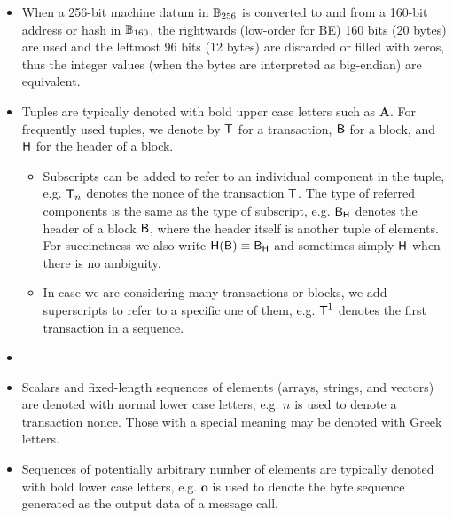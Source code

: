 \begin{itemize}[nosep]
	\item When a 256-bit machine datum in $\mathbb{B}_{256}$ is converted to and from a 160-bit address or hash in $\mathbb{B}_{160}$, the rightwards (low-order for BE) 160 bits (20 bytes) are used and the leftmost 96 bits (12 bytes) are discarded or filled with zeros, thus the integer values (when the bytes are interpreted as big-endian) are equivalent.

	\item Tuples are typically denoted with bold upper case letters such as $\mathbf{A}$. 
	For frequently used tuples, we denote by $\textsf{T}$ for a {\name} transaction, $\textsf{B}$ for a {\name} block, and $\textsf{H}$ for the header of a block. 
	\begin{itemize}[nosep]
		\item Subscripts can be added to refer to an individual component in the tuple, e.g. $\textsf{T}_n$ denotes the nonce of the transaction $\textsf{T}$.
		The type of referred components is the same as the type of subscript, e.g. $\textsf{B}_{\textsf{H}}$ denotes the header of a block $\textsf{B}$, where the header itself is another tuple of elements. 
		For succinctness we also write $\textsf{H}(\textsf{B})\equiv \textsf{B}_{\textsf{H}}$ and sometimes simply $\textsf{H}$ when there is no ambiguity.

		\item In case we are considering many transactions or blocks, we add superscripts to refer to a specific one of them, e.g. $\textsf{T}^1$ denotes the first transaction in a sequence.
	\end{itemize}

	\item {}	   

	\item Scalars and fixed-length sequences of elements (arrays, strings, and vectors) are denoted with normal lower case letters, e.g. $n$ is used to denote a transaction nonce. 
	Those with a special meaning may be denoted with Greek letters.

	\item Sequences of potentially arbitrary number of elements are typically denoted with bold lower case letters, e.g. $\mathbf{o}$ is used to denote the byte sequence generated as the output data of a message call.


\end{itemize}
